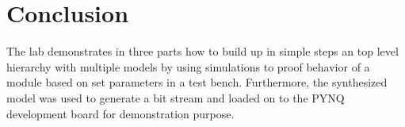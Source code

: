\section{Conclusion}\label{sec: Conclusion}
The lab demonstrates in three parts how to build up in simple steps an top level hierarchy with multiple models by using simulations to proof behavior of a module based on set parameters in a test bench. Furthermore, the synthesized model was used to generate a bit stream and loaded on to the PYNQ development board for demonstration purpose.



